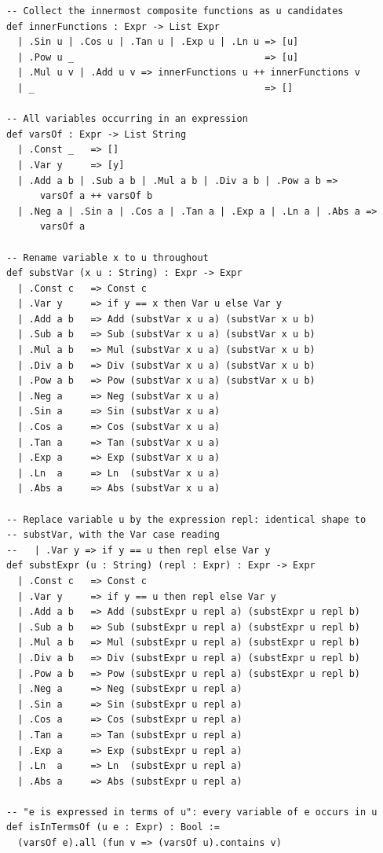 \documentclass[12pt, openany]{book}
\theoremstyle{plain}
\theoremstyle{definition}
\theoremstyle{remark}
\begin{document}
\begin{leanbox}
\begin{lstlisting}
-- Collect the innermost composite functions as u candidates
def innerFunctions : Expr -> List Expr
  | .Sin u | .Cos u | .Tan u | .Exp u | .Ln u => [u]
  | .Pow u _                                  => [u]
  | .Mul u v | .Add u v => innerFunctions u ++ innerFunctions v
  | _                                         => []

-- All variables occurring in an expression
def varsOf : Expr -> List String
  | .Const _   => []
  | .Var y     => [y]
  | .Add a b | .Sub a b | .Mul a b | .Div a b | .Pow a b =>
      varsOf a ++ varsOf b
  | .Neg a | .Sin a | .Cos a | .Tan a | .Exp a | .Ln a | .Abs a =>
      varsOf a

-- Rename variable x to u throughout
def substVar (x u : String) : Expr -> Expr
  | .Const c   => Const c
  | .Var y     => if y == x then Var u else Var y
  | .Add a b   => Add (substVar x u a) (substVar x u b)
  | .Sub a b   => Sub (substVar x u a) (substVar x u b)
  | .Mul a b   => Mul (substVar x u a) (substVar x u b)
  | .Div a b   => Div (substVar x u a) (substVar x u b)
  | .Pow a b   => Pow (substVar x u a) (substVar x u b)
  | .Neg a     => Neg (substVar x u a)
  | .Sin a     => Sin (substVar x u a)
  | .Cos a     => Cos (substVar x u a)
  | .Tan a     => Tan (substVar x u a)
  | .Exp a     => Exp (substVar x u a)
  | .Ln  a     => Ln  (substVar x u a)
  | .Abs a     => Abs (substVar x u a)

-- Replace variable u by the expression repl: identical shape to
-- substVar, with the Var case reading
--   | .Var y => if y == u then repl else Var y
def substExpr (u : String) (repl : Expr) : Expr -> Expr
  | .Const c   => Const c
  | .Var y     => if y == u then repl else Var y
  | .Add a b   => Add (substExpr u repl a) (substExpr u repl b)
  | .Sub a b   => Sub (substExpr u repl a) (substExpr u repl b)
  | .Mul a b   => Mul (substExpr u repl a) (substExpr u repl b)
  | .Div a b   => Div (substExpr u repl a) (substExpr u repl b)
  | .Pow a b   => Pow (substExpr u repl a) (substExpr u repl b)
  | .Neg a     => Neg (substExpr u repl a)
  | .Sin a     => Sin (substExpr u repl a)
  | .Cos a     => Cos (substExpr u repl a)
  | .Tan a     => Tan (substExpr u repl a)
  | .Exp a     => Exp (substExpr u repl a)
  | .Ln  a     => Ln  (substExpr u repl a)
  | .Abs a     => Abs (substExpr u repl a)

-- "e is expressed in terms of u": every variable of e occurs in u
def isInTermsOf (u e : Expr) : Bool :=
  (varsOf e).all (fun v => (varsOf u).contains v)


\end{lstlisting}
\end{leanbox}
\end{document}
